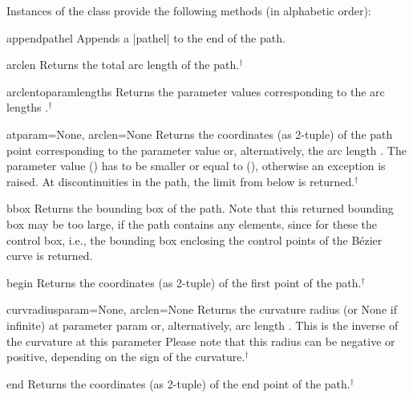 Instances of the class  provide the following
methods (in alphabetic order):

\begin{methoddesc}{append}{pathel}
Appends a \var|pathel| to the end of the path.
\end{methoddesc}

\begin{methoddesc}{arclen}{}
Returns the total arc length of the path.$^\dagger$
\end{methoddesc}

\begin{methoddesc}{arclentoparam}{lengths}
  Returns the parameter values corresponding to the arc lengths
  .$^\dagger$
\end{methoddesc}

\begin{methoddesc}{at}{param=None, arclen=None}
  Returns the coordinates (as 2-tuple) of the path point corresponding to the
  parameter value  or, alternatively, the arc length
  . The parameter value  () has to be smaller
  or equal to  (),
  otherwise an exception is raised.  At discontinuities in the path,
  the limit from below is returned.$^\dagger$
\end{methoddesc}

\begin{methoddesc}{bbox}{}
  Returns the bounding box of the path. Note that this returned
  bounding box may be too large, if the path contains any
   elements, since for these the control box, i.e., the
  bounding box enclosing the control points of the B\'ezier curve is
  returned.
\end{methoddesc}

\begin{methoddesc}{begin}{}
  Returns the coordinates (as 2-tuple) of the first point of the path.$^\dagger$
\end{methoddesc}

\begin{methoddesc}{curvradius}{param=None, arclen=None}
  Returns the curvature radius (or None if infinite) at parameter
  param or, alternatively, arc length .  This is the
  inverse of the curvature at this parameter Please note that this
  radius can be negative or positive, depending on the sign of the
  curvature.$^\dagger$
\end{methoddesc}

\begin{methoddesc}{end}{}
  Returns the coordinates (as 2-tuple) of the end point of the path.$^\dagger$
\end{methoddesc}

